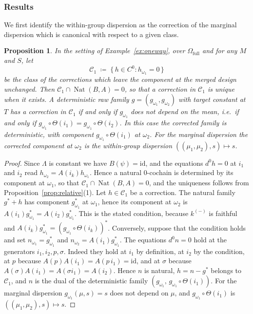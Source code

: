 \documentclass[11pt,a4paper]{article}
\theoremstyle{plain}
\newtheorem{proposition}[theorem]{Proposition}
\theoremstyle{definition}
\theoremstyle{remark}
\newcommand{\cat}[1]{\mathsf{#1}}
\newcommand{\catO}{\cat{\Omega}}
\newcommand{\id}{\mathrm{id}}
\DeclareMathOperator{\Nat}{Nat}
\begin{document}
\subsubsection*{Results}

We first identify the within-group dispersion as the correction of the
marginal dispersion which is canonical with respect to a given class.

\begin{proposition}\label{prop:canonical}
In the setting of Example~\ref{ex:oneway}, over $\catO_{\mathrm{full}}$ and for
any $M$ and $S$, let
\[
\mathcal{C}_{1} \;\coloneqq\; \{\,h \in C^{0} : h_{\omega_1} = 0\,\}
\]
be the class of the corrections which leave the component at the merged design
unchanged. Then $\mathcal{C}_{1} \cap \Nat(B,A) = 0$, so that a correction in
$\mathcal{C}_{1}$ is unique when it exists. A deterministic raw family
$g = (g_{\omega_1},g_{\omega_2})$ with target constant at $T$ has a correction
in $\mathcal{C}_{1}$ if and only if $g_{\omega_1}$ does not depend on the
mean, i.e.\ if and only if
$g_{\omega_1} \circ \Theta(i_1) = g_{\omega_1} \circ \Theta(i_2)$. In this case
the corrected family is deterministic, with component
$g_{\omega_1} \circ \Theta(i_1)$ at $\omega_2$. For the marginal dispersion the
corrected component at $\omega_2$ is the within-group dispersion
$((\mu_1,\mu_2),s) \mapsto s$.
\end{proposition}

\begin{proof}
Since $\Lambda$ is constant we have $B(\psi) = \id$, and the equations
$d^{0}h = 0$ at $i_1$ and $i_2$ read $h_{\omega_2} = A(i_k)h_{\omega_1}$.
Hence a natural $0$-cochain is determined by its component at $\omega_1$, so
that $\mathcal{C}_{1} \cap \Nat(B,A) = 0$, and the uniqueness follows from
Proposition~\ref{prop:relative}(1). Let $h \in \mathcal{C}_{1}$ be a
correction. The natural family $g^{*}+h$ has component $g^{*}_{\omega_1}$ at
$\omega_1$, hence its component at $\omega_2$ is
$A(i_1)g^{*}_{\omega_1} = A(i_2)g^{*}_{\omega_1}$. This is the stated
condition, because $k^{(-)}$ is faithful and
$A(i_k)g^{*}_{\omega_1} = (g_{\omega_1}\circ\Theta(i_k))^{*}$. Conversely,
suppose that the condition holds and set $n_{\omega_1} = g^{*}_{\omega_1}$ and
$n_{\omega_2} = A(i_1)g^{*}_{\omega_1}$. The equations $d^{0}n = 0$ hold at
the generators $i_1, i_2, p, \sigma$. Indeed they hold at $i_1$ by definition,
at $i_2$ by the condition, at $p$ because $A(p)A(i_1) = A(p\,i_1) = \id$, and
at $\sigma$ because $A(\sigma)A(i_1) = A(\sigma i_1) = A(i_2)$. Hence $n$ is
natural, $h = n - g^{*}$ belongs to $\mathcal{C}_{1}$, and $n$ is the dual of
the deterministic family $(g_{\omega_1},\, g_{\omega_1}\circ\Theta(i_1))$. For
the marginal dispersion $g_{\omega_1}(\mu,s) = s$ does not depend on $\mu$,
and $g_{\omega_1}\circ\Theta(i_1)$ is $((\mu_1,\mu_2),s) \mapsto s$.
\end{proof}
\end{document}
